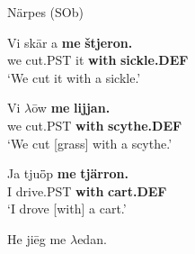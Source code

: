 Närpes (SOb) 



\item 


 \ea\label{}
\gll Vi  sk\=ar  a  \textbf{me} \textbf{štjeron.} \\


we  cut.PST  it  \textbf{with} \textbf{sickle.DEF} \\

\glt ‘We cut it with a sickle.’

\z

\item 


 \ea\label{}
\gll Vi  $\lambda $\=ow  \textbf{me} \textbf{lijjan.} \\


we  cut.PST  \textbf{with} \textbf{scythe.DEF} \\

\glt ‘We cut [grass] with a scythe.’

\z

\item 


 \ea\label{}
\gll Ja  tju\={ö}p  \textbf{me} \textbf{tjärron.} \\


I  drive.PST  \textbf{with} \textbf{cart.DEF} \\

\glt ‘I drove [with] a cart.’ 

\z

\item 


He  ji\=eg  me  $\lambda $edan.

